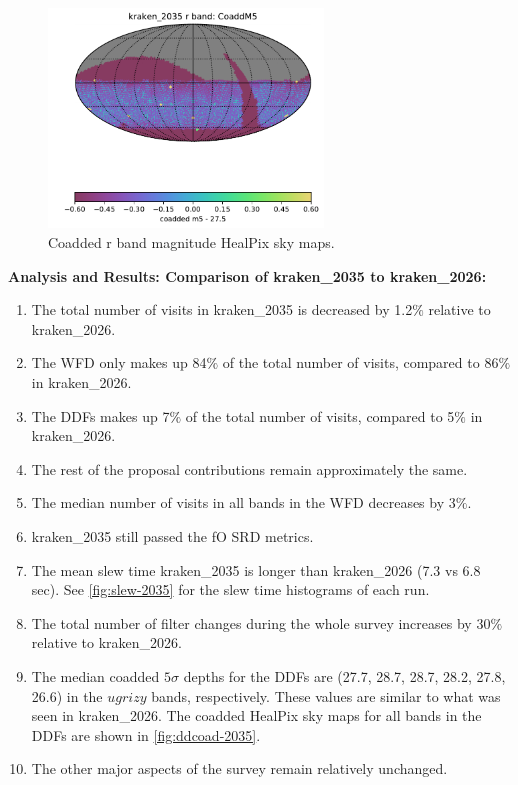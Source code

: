\documentclass[DM,authoryear,toc]{lsstdoc}
\begin{document}
\begin{figure}[ht]
\centering
\includegraphics[width=0.65\textwidth]{figures/kraken_2035_CoaddM5_r_band_HEAL_SkyMap.pdf}
\caption{Coadded r band magnitude HealPix sky maps.}
\label{fig:rbandmap-2035}
\end{figure}

\textbf{Analysis and Results: Comparison of kraken\_2035 to kraken\_2026:}

\begin{enumerate}
\item The total number of visits in kraken\_2035 is decreased by 1.2$\%$ relative to kraken\_2026.
\item The WFD only makes up 84$\%$ of the total number of visits, compared to 86$\%$ in kraken\_2026.
\item The DDFs makes up 7$\%$ of the total number of visits, compared to 5$\%$ in kraken\_2026.
\item The rest of the proposal contributions remain approximately the same.
\item The median number of visits in all bands in the WFD decreases by 3$\%$.
\item kraken\_2035 still passed the fO SRD metrics.
\item The mean slew time kraken\_2035 is longer than kraken\_2026 (7.3 vs 6.8 sec).
See \autoref{fig:slew-2035} for the slew time histograms of each run.
\item The total number of filter changes during the whole survey increases by 30$\%$ relative to kraken\_2026.
\item The median coadded $5\sigma$ depths for the DDFs are (27.7, 28.7, 28.7, 28.2, 27.8, 26.6) in the $ugrizy$ bands, respectively.
These values are similar to what was seen in kraken\_2026. The coadded HealPix sky maps for all bands in the DDFs are shown in
 \autoref{fig:ddcoad-2035}.
\item The other major aspects of the survey remain relatively unchanged.

\end{enumerate}
\end{document}
